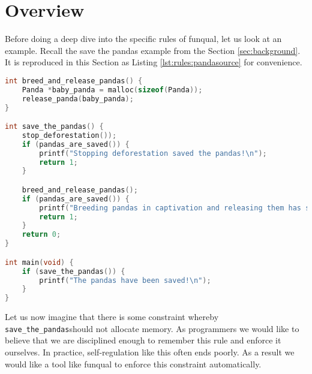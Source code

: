 \section{Overview}\label{sec:rules:overview}

Before doing a deep dive into the specific rules of funqual, let us look at an example.  Recall the save the pandas example from the Section \ref{sec:background}.  It is reproduced in this Section as Listing \ref{lst:rules:pandasource} for convenience.  

\noindent\begin{minipage}[t]{\linewidth}
\begin{lstlisting}[language=C,caption={Example C program.  Running this code in a production environment may not actually save the pandas},label={lst:rules:pandasource}]
int breed_and_release_pandas() {
    Panda *baby_panda = malloc(sizeof(Panda));
    release_panda(baby_panda);
}

int save_the_pandas() {
	stop_deforestation());
	if (pandas_are_saved()) {
		printf("Stopping deforestation saved the pandas!\n");
		return 1;
	}

	breed_and_release_pandas();
	if (pandas_are_saved()) {
		printf("Breeding pandas in captivation and releasing them has saved the pandas!\n");
		return 1;
	}
	return 0;
}

int main(void) {
	if (save_the_pandas()) {
		printf("The pandas have been saved!\n");
	}
}
\end{lstlisting}
\end{minipage}

Let us now imagine that there is some constraint whereby \lstinline{save_the_pandas}should not allocate memory. As programmers we would like to believe that we are disciplined enough to remember this rule and enforce it ourselves. In practice, self-regulation like this often ends poorly. As a result we would like a tool like funqual to enforce this constraint automatically.

